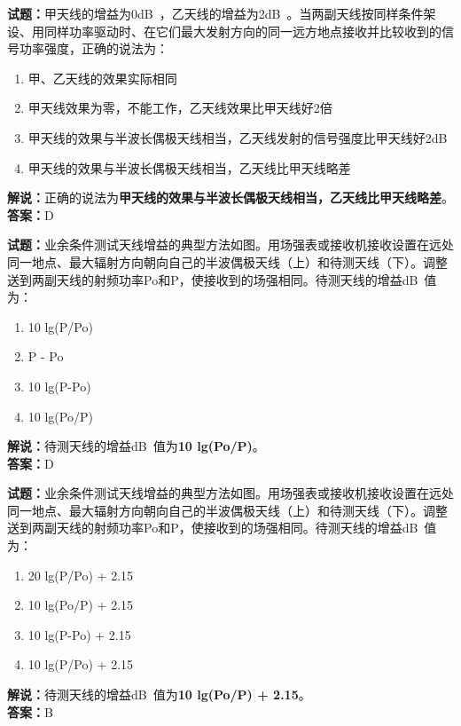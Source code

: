 \documentclass{ctexbook}
\begin{document}
\bigskip


\noindent\textbf{试题：}甲天线的增益为0\unit[qualifier-mode=combine]{\deci\bel{}}，乙天线的增益为2\unit[qualifier-mode=combine]{\deci\bel{}}。当两副天线按同样条件架设、用同样功率驱动时、在它们最大发射方向的同一远方地点接收并比较收到的信号功率强度，正确的说法为：
\begin{enumerate}[leftmargin=3em]
\item 甲、乙天线的效果实际相同
\item 甲天线效果为零，不能工作，乙天线效果比甲天线好2倍%
\item 甲天线的效果与半波长偶极天线相当，乙天线发射的信号强度比甲天线好2dB%
\item 甲天线的效果与半波长偶极天线相当，乙天线比甲天线略差%
\end{enumerate}
\noindent\textbf{解说：}正确的说法为\textbf{甲天线的效果与半波长偶极天线相当，乙天线比甲天线略差}。\\\noindent\textbf{答案：}D



\bigskip


\noindent\textbf{试题：}业余条件测试天线增益的典型方法如图。用场强表或接收机接收设置在远处同一地点、最大辐射方向朝向自己的半波偶极天线（上）和待测天线（下）。调整送到两副天线的射频功率Po和P，使接收到的场强相同。待测天线的增益\unit[qualifier-mode=combine]{\deci\bel{}}值为：
\begin{enumerate}[leftmargin=3em]
\item 10 lg(P/Po)
\item P - Po
\item 10 lg(P-Po)
\item 10 lg(Po/P)
\end{enumerate}
\noindent\textbf{解说：}待测天线的增益\unit[qualifier-mode=combine]{\deci\bel{}}值为\textbf{10 lg(Po/P)}。\\\noindent\textbf{答案：}D



\bigskip


\noindent\textbf{试题：}业余条件测试天线增益的典型方法如图。用场强表或接收机接收设置在远处同一地点、最大辐射方向朝向自己的半波偶极天线（上）和待测天线（下）。调整送到两副天线的射频功率Po和P，使接收到的场强相同。待测天线的增益\unit[qualifier-mode=combine]{\deci\bel{}}值为：
\begin{enumerate}[leftmargin=3em]
\item 20 lg(P/Po) + 2.15
\item 10 lg(Po/P) + 2.15
\item 10 lg(P-Po) + 2.15
\item 10 lg(P/Po) + 2.15
\end{enumerate}
\noindent\textbf{解说：}待测天线的增益\unit[qualifier-mode=combine]{\deci\bel{}}值为\textbf{10 lg(Po/P) + 2.15}。\\\noindent\textbf{答案：}B
\end{document}
